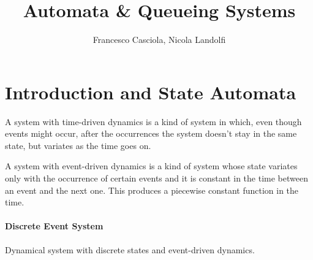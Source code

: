 \documentclass[12pt,a4paper]{article}
\title{Automata \& Queueing Systems}
\author{Francesco Casciola, Nicola Landolfi}
\begin{document}
\maketitle
\tableofcontents
\newpage
\section{Introduction and State Automata}
\label{sec:Int}
A system with time-driven dynamics is a kind of system in which, even though events might occur, after the occurrences the system doesn’t stay in the same state, but variates as the time goes on.

\bigskip
\noindent
A system with event-driven dynamics is a kind of system whose state variates only with the occurrence of certain events and it is constant in the time between an event and the next one. This produces a piecewise constant function in the time.

\paragraph{Discrete Event System} Dynamical system with discrete states and event-driven dynamics.
\end{document}
